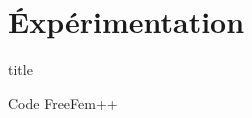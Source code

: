 \documentclass[french]{beamer}
\begin{document}
% 
%   
%   
%   
%     
%
%
  \section{Éxpérimentation}
  \begin{frame}
    \vfill
    \centering
    \begin{beamercolorbox}[sep=8pt,center,shadow=true,rounded=true]{title}
      \insertsectionhead
    \end{beamercolorbox}
    \vfill
  \end{frame}

  \begin{frame}{Code FreeFem++}

  \end{frame}
\end{document}
